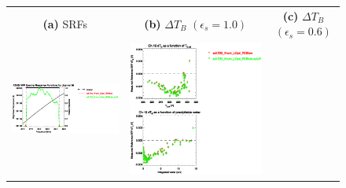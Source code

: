 \begin{figure}[H]
  \centering
  \begin{tabular}{c c c}
    \textsf{\textbf{(a)} SRFs} &
    \textsf{\textbf{(b)} $\Delta T_B$ $(\epsilon_s = 1.0)$} &
    \textsf{\textbf{(c)} $\Delta T_B$ $(\epsilon_s = 0.6)$} \\
    \includegraphics[bb=80 400 280 558,clip,scale=0.85]{graphics/srf/Rset/atms_npp.ch16.osrf.eps} &
    \includegraphics[bb=85 400 260 558,clip,scale=0.85]{graphics/dtb/Rset/e1.0_r0.0/atms_npp.ch16.dTb.eps} & 

\end{tabular}
\end{figure}
